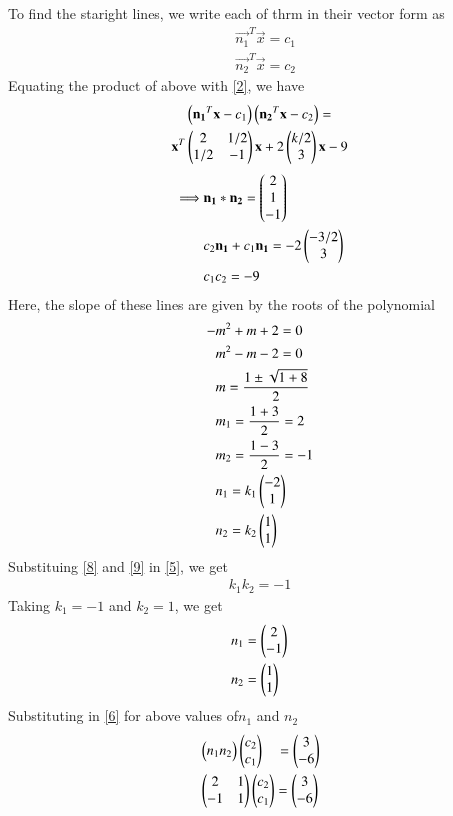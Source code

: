 \documentclass[journal,12pt,twocolumn]{IEEEtran}
\begin{document}
To find the staright lines, we write each of thrm in their vector form as
\begin{align}
	& \vec{n_1}^T\vec{x} =c_1 \\
	& \vec{n_2}^T\vec{x} =c_2 
\end{align} 
Equating the product of above with \eqref{2}, we have
\begin{multline}
 \left(\mathbf{n_1}^T\mathbf{x}-c_1\right)\left(\mathbf{n_2}^T\mathbf{x}-c_2\right) = \\ 
\mathbf{x}^T\begin{pmatrix}2 & 1/2 \\ 1/2 & -1\end{pmatrix}\mathbf{x}+2\begin{pmatrix}k/2 \\ 3\end{pmatrix}\mathbf{x}-9
\end{multline}
\begin{align}
\implies & \mathbf{n_1}*\mathbf{n_2} = \begin{pmatrix}2 \\ 1 \\ -1\end{pmatrix}\label{5} \\
& c_2\mathbf{n_1} + c_1\mathbf{n_1} =-2\begin{pmatrix}-3/2 \\ 3\end{pmatrix}\label{6} \\
& c_1c_2 = -9 \label{7}
\end{align}
Here, the slope of these lines are given by the roots of the polynomial
\begin{align}
-& m^2 + m + 2 = 0 \\ 
 & m^2 - m - 2 = 0 \\
 & m = \frac{1 \pm \sqrt{1+8}}{2} \\
 & m_1 = \frac{1+3}{2} = 2 \\
 & m_2 = \frac{1-3}{2} = -1 \\
 & n_1 = k_1\begin{pmatrix}-2 \\ 1\end{pmatrix}\label{8} \\
 & n_2 = k_2\begin{pmatrix}1 \\ 1\end{pmatrix}\label{9}
\end{align}
Substituing \eqref{8} and \eqref{9} in \eqref{5}, we get
\begin{align}
	k_1k_2 = -1
\end{align}
Taking $k_1=-1$ and $k_2=1$, we get
\begin{align}
	& n_1 = \begin{pmatrix}2 \\ -1\end{pmatrix} \\
	& n_2 = \begin{pmatrix}1 \\ 1\end{pmatrix}
\end{align}
Substituting in \eqref{6} for  above values of$n_1$ and $n_2$
\begin{align}
& \begin{pmatrix} n_1 n_2\end{pmatrix} \begin{pmatrix}c_2 \\ c_1\end{pmatrix} \quad= \begin{pmatrix}3\\-6\end{pmatrix} \\
& \begin{pmatrix}2 &1 \\ -1 &1\end{pmatrix} \begin{pmatrix}c_2 \\ c_1\end{pmatrix} = \begin{pmatrix}3\\-6\end{pmatrix}\label{10}
\end{align}
\end{document}
